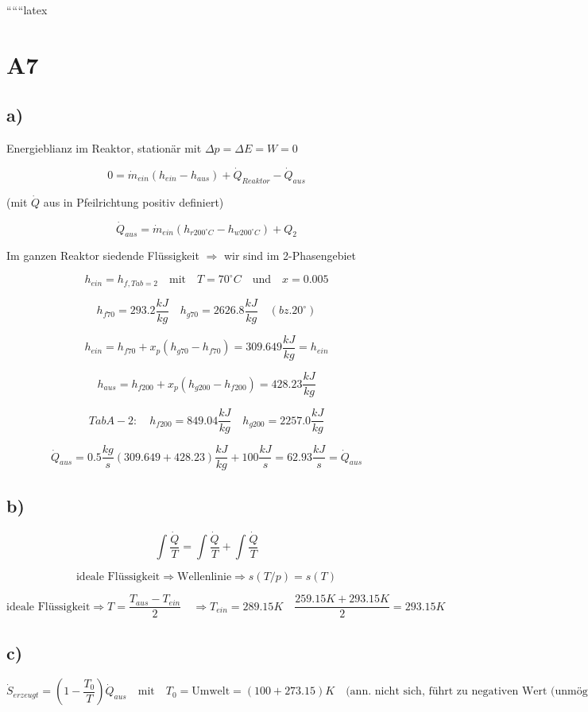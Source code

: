 
``````latex


\section*{A7}

\subsection*{a)}
Energieblianz im Reaktor, stationär mit $\Delta p = \Delta E = W = 0$

\[
0 = \dot{m}_{ein} (h_{ein} - h_{aus}) + \dot{Q}_{Reaktor} - \dot{Q}_{aus}
\]

(mit $\dot{Q}$ aus in Pfeilrichtung positiv definiert)

\[
\dot{Q}_{aus} = \dot{m}_{ein} (h_{r200^\circ C} - h_{w200^\circ C}) + Q_2
\]

Im ganzen Reaktor siedende Flüssigkeit $\Rightarrow$ wir sind im 2-Phasengebiet

\[
h_{ein} = h_{f, Tab = 2} \quad \text{mit} \quad T = 70^\circ C \quad \text{und} \quad x = 0.005
\]

\[
h_{f70} = 293.2 \frac{kJ}{kg} \quad h_{g70} = 2626.8 \frac{kJ}{kg} \quad (bz. 20^\circ)
\]

\[
h_{ein} = h_{f70} + x_p (h_{g70} - h_{f70}) = 309.649 \frac{kJ}{kg} = h_{ein}
\]

\[
h_{aus} = h_{f200} + x_p (h_{g200} - h_{f200}) = 428.23 \frac{kJ}{kg}
\]

\[
Tab A-2: \quad h_{f200} = 849.04 \frac{kJ}{kg} \quad h_{g200} = 2257.0 \frac{kJ}{kg}
\]

\[
\dot{Q}_{aus} = 0.5 \frac{kg}{s} (309.649 + 428.23) \frac{kJ}{kg} + 100 \frac{kJ}{s} = 62.93 \frac{kJ}{s} = \dot{Q}_{aus}
\]

\subsection*{b)}
\[
\int \frac{\dot{Q}}{T} = \int \frac{\dot{Q}}{T} + \int \frac{\dot{Q}}{T}
\]

\[
\text{ideale Flüssigkeit} \Rightarrow \text{Wellenlinie} \Rightarrow s(T/p) = s(T)
\]

\[
\text{ideale Flüssigkeit} \Rightarrow T = \frac{T_{aus} - T_{ein}}{2} \quad \Rightarrow T_{ein} = 289.15 K \quad \frac{259.15 K + 293.15 K}{2} = 293.15 K
\]

\subsection*{c)}
\[
\dot{S}_{erzeugt} = \left(1 - \frac{T_0}{T}\right) \dot{Q}_{aus} \quad \text{mit} \quad T_0 = \text{Umwelt} = (100 + 273.15) K \quad \text{(ann. nicht sich, führt zu negativen Wert (unmöglich))}
\]


